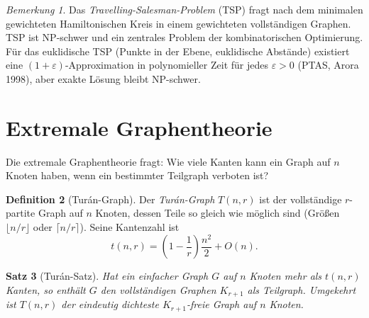 \documentclass[12pt,a4paper]{amsart}
\newtheorem{theorem}{Satz}[section]
\theoremstyle{definition}
\newtheorem{definition}[theorem]{Definition}
\theoremstyle{remark}
\newtheorem{remark}[theorem]{Bemerkung}
\begin{document}
\begin{remark}
Das \emph{Travelling-Salesman-Problem} (TSP) fragt nach dem
minimalen gewichteten Hamiltonischen Kreis in einem gewichteten vollständigen
Graphen. TSP ist NP-schwer und ein zentrales Problem der kombinatorischen
Optimierung. Für das euklidische TSP (Punkte in der Ebene, euklidische
Abstände) existiert eine $(1+\varepsilon)$-Approximation in polynomieller
Zeit für jedes $\varepsilon > 0$ (PTAS, Arora 1998), aber exakte Lösung
bleibt NP-schwer.
\end{remark}

\section{Extremale Graphentheorie}
\label{sec:extremal}

Die extremale Graphentheorie fragt: Wie viele Kanten kann ein Graph auf $n$
Knoten haben, wenn ein bestimmter Teilgraph verboten ist?

\begin{definition}[Turán-Graph]
Der \emph{Turán-Graph} $T(n, r)$ ist der vollständige $r$-partite Graph auf
$n$ Knoten, dessen Teile so gleich wie möglich sind (Größen
$\lfloor n/r \rfloor$ oder $\lceil n/r \rceil$). Seine Kantenzahl ist
\[
  t(n, r) = \left(1 - \frac{1}{r}\right)\frac{n^2}{2} + O(n).
\]
\end{definition}

\begin{theorem}[Turán-Satz]
\label{satz:turan}
Hat ein einfacher Graph $G$ auf $n$ Knoten mehr als $t(n, r)$ Kanten, so
enthält $G$ den vollständigen Graphen $K_{r+1}$ als Teilgraph. Umgekehrt ist
$T(n,r)$ der eindeutig dichteste $K_{r+1}$-freie Graph auf $n$ Knoten.
\end{theorem}
\end{document}
